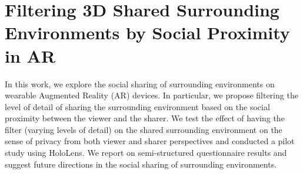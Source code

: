 \section{Filtering 3D Shared Surrounding Environments by Social Proximity in AR}





In this work, we explore the social sharing of surrounding environments on wearable Augmented Reality (AR) devices. In particular, we propose filtering the level of detail of sharing the surrounding environment based on the social proximity between the viewer and the sharer. We test the effect of having the filter (varying levels of detail) on the shared surrounding environment on the sense of privacy from both viewer and sharer perspectives and conducted a pilot study using HoloLens. We report on semi-structured questionnaire results and suggest future directions in the social sharing of surrounding environments.





